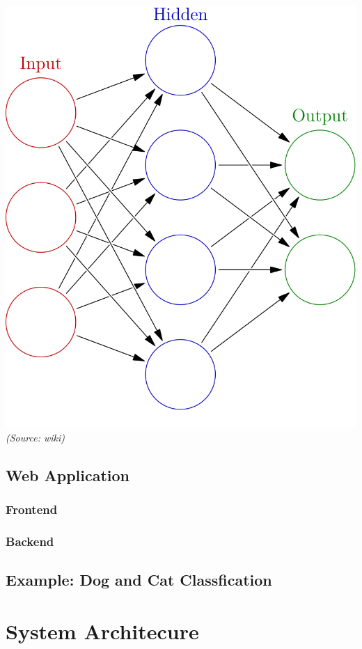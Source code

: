 \begin{center}
\includegraphics[scale=0.25]{ann}\\
\textit{(Source: wiki)}
\end{center}
\subsection{Web Application}
\subsubsection{Frontend}
\subsubsection{Backend}

\subsection{Example: Dog and Cat Classfication}

\newpage
\section{System Architecure}
